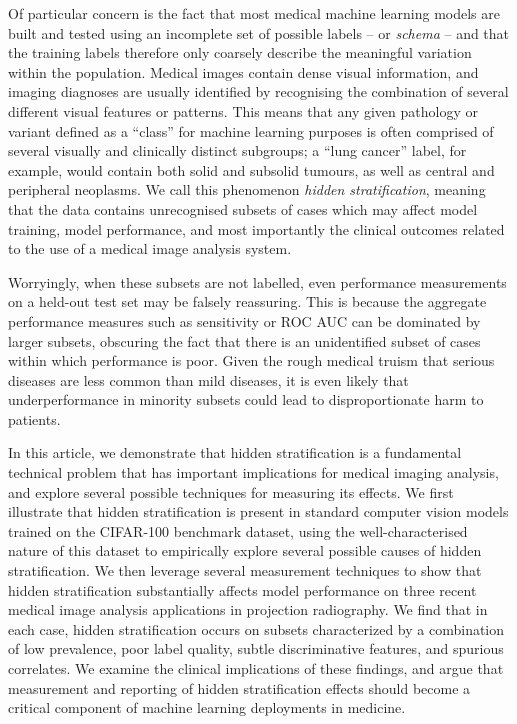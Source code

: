 \documentclass{article}
\begin{document}
Of particular concern is the fact that most medical machine learning models are built and tested using an incomplete set of possible labels -- or \textit{schema} -- and that the training labels therefore only coarsely describe the meaningful variation within the population. 
Medical images contain dense visual information, and imaging diagnoses are usually identified by recognising the combination of several different visual features or patterns. 
This means that any given pathology or variant defined as a ``class'' for machine learning purposes is often comprised of several visually and clinically distinct subgroups; a ``lung cancer'' label, for example, would contain both solid and subsolid tumours, as well as central and peripheral neoplasms. 
We call this phenomenon \textit{hidden stratification}, meaning that the data contains unrecognised subsets of cases which may affect model training, model performance, and most importantly the clinical outcomes related to the use of a medical image analysis system.  

Worryingly, when these subsets are not labelled, even performance measurements on a held-out test set may be falsely reassuring. 
This is because the aggregate performance measures such as sensitivity or ROC AUC can be dominated by larger subsets, obscuring the fact that there is an unidentified subset of cases within which performance is poor. 
Given the rough medical truism that serious diseases are less common than mild diseases, it is even likely that underperformance in minority subsets could lead to disproportionate harm to patients.

In this article, we demonstrate that hidden stratification is a fundamental technical problem that has important implications for medical imaging analysis, and explore several possible techniques for measuring its effects. 
We first illustrate that hidden stratification is present in standard computer vision models trained on the CIFAR-100 benchmark dataset, using the well-characterised nature of this dataset to empirically explore several possible causes of hidden stratification.
We then leverage several measurement techniques to show that hidden stratification substantially affects model performance on three recent medical image analysis applications in projection radiography.
We find that in each case, hidden stratification occurs on subsets characterized by a combination of low prevalence, poor label quality, subtle discriminative features, and spurious correlates. 
We examine the clinical implications of these findings, and argue that measurement and reporting of hidden stratification effects should become a critical component of machine learning deployments in medicine.
\end{document}
